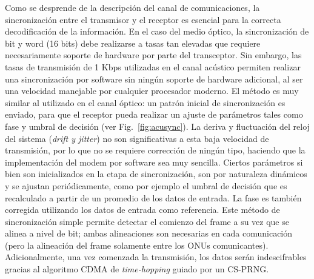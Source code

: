 Como se desprende de la descripción del canal de comunicaciones, la sincronización entre el transmisor y el receptor es esencial para la correcta decodificación de la información. 
En el caso del medio óptico, la sincronización de bit y word (16 bits) debe realizarse a tasas tan elevadas que requiere necesariamente soporte de hardware por parte del transceptor.
Sin embargo, las tasas de transmisión de 1 Kbps utilizadas en el canal acústico permiten realizar una sincronización por software sin ningún soporte de hardware adicional, al ser una velocidad manejable por cualquier procesador moderno.
El método es muy similar al utilizado en el canal óptico: un patrón inicial de sincronización es enviado, para que el receptor pueda realizar un ajuste de parámetros tales como fase y umbral de decisión (ver Fig.~\ref{fig:acusync}). La deriva y fluctuación del reloj del sistema (\textit{drift y jitter}) no son significativas a esta baja velocidad de transmisión, por lo que no se requiere corrección de ningún tipo, haciendo que la implementación del modem por software sea muy sencilla.
Ciertos parámetros si bien son inicializados en la etapa de sincronización, son por naturaleza dinámicos y se ajustan periódicamente, como por ejemplo el umbral de decisión que es recalculado a partir de un promedio de los datos de entrada. La fase es también corregida utilizando los datos de entrada como referencia. Este método de sincronización simple permite detectar el comienzo del frame a su vez que se alinea a nivel de bit; ambas alineaciones son necesarias en cada comunicación (pero la alineación del frame solamente entre los ONUs comunicantes). Adicionalmente, una vez comenzada la transmisión, los datos serán indescifrables gracias al algoritmo CDMA de \textit{time-hopping} guiado por un CS-PRNG.



